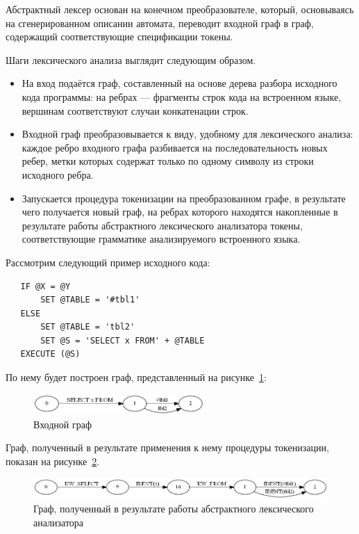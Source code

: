Абстрактный лексер основан на конечном преобразователе, который, 
основываясь на сгенерированном описании автомата, переводит 
входной граф в граф, содержащий соответствующие спецификации токены. 

Шаги лексического анализа выглядит следующим образом.
\begin{itemize}
    \item На вход подаётся граф, составленный на основе дерева разбора исходного 
    кода программы: на ребрах --- фрагменты строк кода на встроенном языке, 
    вершинам соответствуют случаи конкатенации строк.
    \item Входной граф преобразовывается к виду, удобному для лексического 
    анализа: каждое ребро входного графа разбивается на последовательность новых 
    ребер, метки которых содержат только по одному символу из строки исходного 
    ребра.
    \item Запускается процедура токенизации на преобразованном графе, в 
    результате чего получается новый граф, на ребрах которого находятся 
    накопленные в результате работы абстрактного лексического анализатора 
    токены, соответствующие грамматике анализируемого встроенного языка.
\end{itemize}

Рассмотрим следующий пример исходного кода:

\begin{verbatim}
   IF @X = @Y
       SET @TABLE = '#tbl1'
   ELSE
       SET @TABLE = 'tbl2'
       SET @S = 'SELECT x FROM' + @TABLE
   EXECUTE (@S)
\end{verbatim}

По нему будет построен граф, представленный на рисунке~\ref{SimpleSql}:
\begin{figure}[h]
 \label{SimpleSql}
 \centering
 \includegraphics[width=6.5cm]{Verbitskaya/SimpleSql.png}
 \caption{Входной граф}
 \label{SimpleSql}
\end{figure}

Граф, полученный в результате применения к нему процедуры токенизации,  
показан на рисунке~\ref{SimpleSqlLex}.

\begin{figure}[h]
 \label{SimpleSqlLex}
 \centering
 \includegraphics[width=12cm]{Verbitskaya/SimpleSql_lex.png}
 \caption{Граф, полученный в результате работы абстрактного лексического анализатора}
 \label{SimpleSqlLex}
\end{figure}

